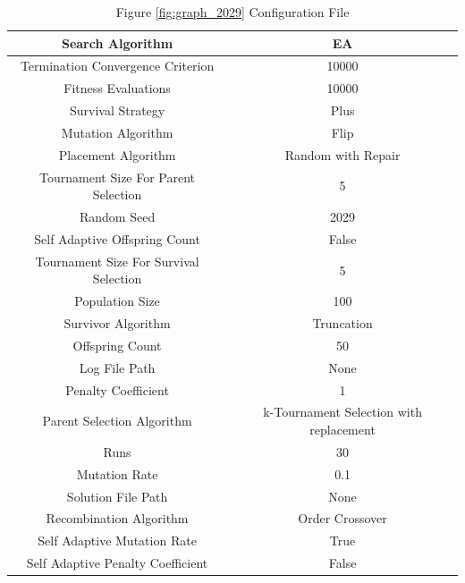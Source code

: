 \documentclass{standalone}
\begin{document}
\begin{table}[!htb]
	\centering
	\caption{Figure \ref{fig:graph_2029} Configuration File}
	\label{tab:graph_2029}
	\begin{tabular}{| c | c |}
		\hline
		Search Algorithm		& EA		 \\
		\hline
		Termination Convergence Criterion		& 10000		 \\
		\hline
		Fitness Evaluations		& 10000		 \\
		\hline
		Survival Strategy		& Plus		 \\
		\hline
		Mutation Algorithm		& Flip		 \\
		\hline
		Placement Algorithm		& Random with Repair		 \\
		\hline
		Tournament Size For Parent Selection		& 5		 \\
		\hline
		Random Seed		& 2029		 \\
		\hline
		Self Adaptive Offspring Count		& False		 \\
		\hline
		Tournament Size For Survival Selection		& 5		 \\
		\hline
		Population Size		& 100		 \\
		\hline
		Survivor Algorithm		& Truncation		 \\
		\hline
		Offspring Count		& 50		 \\
		\hline
		Log File Path		& None		 \\
		\hline
		Penalty Coefficient		& 1		 \\
		\hline
		Parent Selection Algorithm		& k-Tournament Selection with replacement		 \\
		\hline
		Runs		& 30		 \\
		\hline
		Mutation Rate		& 0.1		 \\
		\hline
		Solution File Path		& None		 \\
		\hline
		Recombination Algorithm		& Order Crossover		 \\
		\hline
		Self Adaptive Mutation Rate		& True		 \\
		\hline
		Self Adaptive Penalty Coefficient		& False		 \\
		\hline
	\end{tabular}
\end{table}
\end{document}
